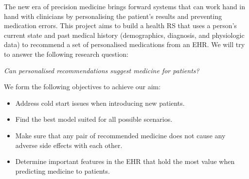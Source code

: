 \label{AimObjectives}
The new era of precision medicine brings forward systems that can work
hand in hand with clinicians by personalising the patient's results and
preventing medication errors. This project aims to build a health RS that
uses a person's current state and past medical history (demographics,
diagnosis, and physiologic data) to recommend a set of personalised
medications from an EHR. We will try to answer the following research
question:

\begin{center}
    \textit{
        Can personalised recommendations suggest medicine for patients?
    }
\end{center}


We form the following objectives to achieve our aim:

\begin{itemize}

    \item Address cold start issues when introducing new patients.

     \item Find the best model suited for all possible scenarios.

    \item Make sure that any pair of recommended medicine does not
        cause any adverse side effects with each other.

    \item 
        Determine important features in the EHR that hold the most value
        when predicting medicine to patients.

\end{itemize}
